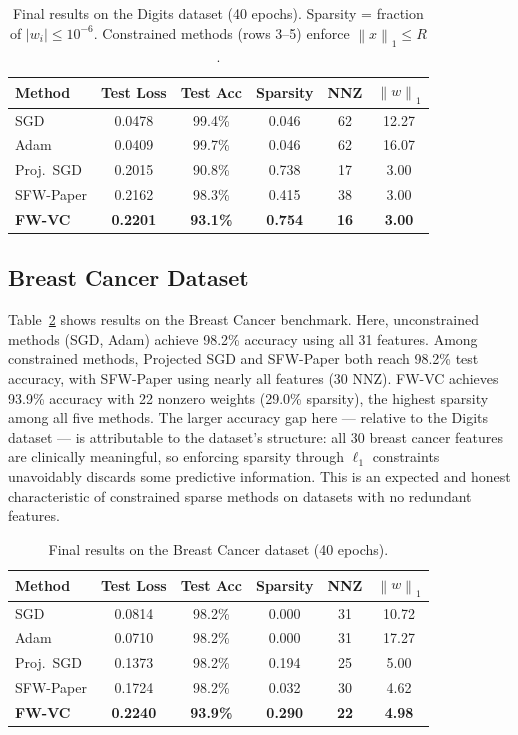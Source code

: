 \documentclass[10pt,twocolumn]{article}
\newcommand{\norm}[1]{\left\|#1\right\|}
\begin{document}
\begin{table}[h]
\centering
\caption{Final results on the Digits dataset (40 epochs).
Sparsity = fraction of $|w_i| \leq 10^{-6}$.
Constrained methods (rows 3--5) enforce $\norm{x}_1 \leq R$.}
\label{tab:digits}
\small
\begin{tabular}{lccccc}
\toprule
Method & Test Loss & Test Acc & Sparsity & NNZ & $\norm{w}_1$ \\
\midrule
SGD           & 0.0478 & 99.4\% & 0.046 & 62 & 12.27 \\
Adam          & 0.0409 & 99.7\% & 0.046 & 62 & 16.07 \\
\midrule
Proj.\ SGD    & 0.2015 & 90.8\% & 0.738 & 17 & 3.00  \\
SFW-Paper     & 0.2162 & 98.3\% & 0.415 & 38 & 3.00  \\
\textbf{FW-VC}& \textbf{0.2201} & \textbf{93.1\%} & \textbf{0.754} & \textbf{16} & \textbf{3.00} \\
\bottomrule
\end{tabular}
\end{table}

\subsection{Breast Cancer Dataset}

Table~\ref{tab:bc} shows results on the Breast Cancer benchmark.
Here, unconstrained methods (SGD, Adam) achieve 98.2\% accuracy using
all 31 features. Among constrained methods, Projected SGD and SFW-Paper
both reach 98.2\% test accuracy, with SFW-Paper using nearly all
features (30 NNZ). FW-VC achieves 93.9\% accuracy with 22 nonzero
weights (29.0\% sparsity), the highest sparsity among all five methods.
The larger accuracy gap here — relative to the Digits dataset — is
attributable to the dataset's structure: all 30 breast cancer features
are clinically meaningful, so enforcing sparsity through $\ell_1$
constraints unavoidably discards some predictive information.
This is an expected and honest characteristic of constrained sparse
methods on datasets with no redundant features.

\begin{table}[h]
\centering
\caption{Final results on the Breast Cancer dataset (40 epochs).}
\label{tab:bc}
\small
\begin{tabular}{lccccc}
\toprule
Method & Test Loss & Test Acc & Sparsity & NNZ & $\norm{w}_1$ \\
\midrule
SGD           & 0.0814 & 98.2\% & 0.000 & 31 & 10.72 \\
Adam          & 0.0710 & 98.2\% & 0.000 & 31 & 17.27 \\
\midrule
Proj.\ SGD    & 0.1373 & 98.2\% & 0.194 & 25 & 5.00  \\
SFW-Paper     & 0.1724 & 98.2\% & 0.032 & 30 & 4.62  \\
\textbf{FW-VC}& \textbf{0.2240} & \textbf{93.9\%} & \textbf{0.290} & \textbf{22} & \textbf{4.98} \\
\bottomrule
\end{tabular}
\end{table}
\end{document}
